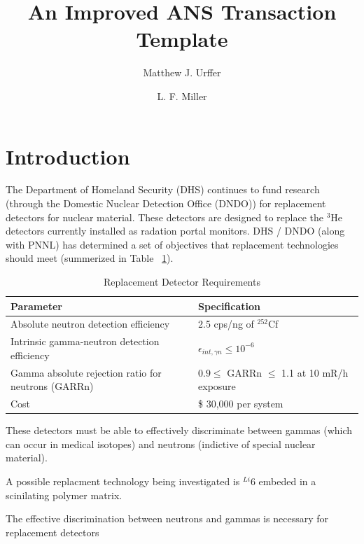 \documentclass{anstrans}
\title{An Improved ANS Transaction Template}
\author{Matthew J. Urffer \and L. F. Miller}
\institute{
Department of Nuclear Engineering, University of Tennessee, Knoxville, TN, 37916
}
\newcommand{\iso}[2]{${}^{#2}${#1}}
\begin{document}
\section{Introduction}
The Department of Homeland Security (DHS) continues to fund research (through the Domestic Nuclear Detection Office (DNDO)) for replacement detectors for nuclear material.
These detectors are designed to replace the \iso{He}{3} detectors currently installed as radation portal monitors.
DHS / DNDO (along with PNNL) has determined a set of objectives that replacement technologies should meet (summerized in Table ~\ref{tab:DHSCriteria}).
\begin{table}[h]
    \caption{Replacement Detector Requirements  }
	\centering
	\begin{tabular}{p{} | p{} }
	Parameter & Specification \\
	\hline
	\hline
	Absolute neutron detection efficiency & 2.5 cps/ng of ${}^{252}$Cf \\
	Intrinsic gamma-neutron detection efficiency & $ \epsilon_{int,\gamma n}\leq 10^{-6}$ \\
	Gamma absolute rejection ratio for neutrons (GARRn) & $ 0.9 \leq \text{ GARRn }\leq$ 1.1 at 10 mR/h exposure \\
	Cost &  \$ 30,000 per system \\
	\hline
	\end{tabular}
    \label{tab:DHSCriteria}
\end{table}
These detectors must be able to effectively discriminate between gammas (which can occur in medical isotopes) and neutrons (indictive of special nuclear material).

A possible replacment technology being investigated is \iso{6}{Li} embeded in a scinilating polymer matrix.

The effective discrimination between neutrons and gammas is necessary for replacement detectors 
\end{document}

